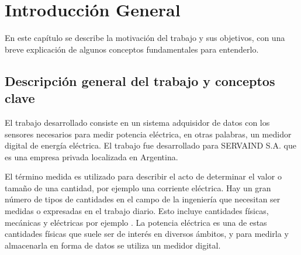 
\chapter{Introducción General} %
En este capítulo se describe la motivación del trabajo y sus objetivos, con una breve explicación de algunos conceptos fundamentales para entenderlo.

\label{Chapter1} %


\newcommand{\keyword}[1]{\textbf{#1}}
\newcommand{\tabhead}[1]{\textbf{#1}}
\newcommand{\code}[1]{\texttt{#1}}
\newcommand{\file}[1]{\texttt{\bfseries#1}}
\newcommand{\option}[1]{\texttt{\itshape#1}}
\newcommand{\grados}{$^{\circ}$}



\section{Descripción general del trabajo y conceptos clave}

El trabajo desarrollado consiste en un sistema adquisidor de datos con los sensores necesarios para medir potencia eléctrica, en otras palabras, un medidor digital de energía eléctrica. El trabajo fue desarrollado para SERVAIND S.A. que es una empresa privada localizada en Argentina.

El término medida es utilizado para describir el acto de determinar el valor o tamaño de una cantidad, por ejemplo una corriente eléctrica. Hay un gran número de tipos de cantidades en el campo de la ingeniería que necesitan ser medidas o expresadas en el trabajo diario. Esto incluye cantidades físicas, mecánicas y eléctricas por ejemplo \citep{book:1689974}. La potencia eléctrica es una de estas cantidades físicas que suele ser de interés en diversos ámbitos, y para medirla y almacenarla en forma de datos se utiliza un medidor digital.

